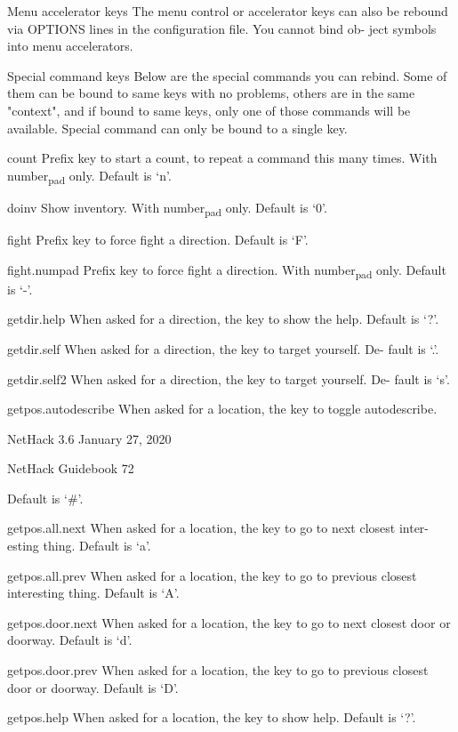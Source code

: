 \documentclass[11pt]{article}
\begin{document}
Menu accelerator keys
 The menu control or accelerator keys can also be rebound via
 OPTIONS lines in the configuration file. You cannot bind ob-
 ject symbols into menu accelerators.

Special command keys
 Below are the special commands you can rebind.  Some of them
 can be bound to same keys with no problems, others are in the
 same "context", and if bound to same keys, only one of those
 commands will be available. Special command can only be bound
 to a single key.

count
 Prefix key to start a count, to repeat a command this many
 times. With number\textsubscript{pad} only. Default is `n'.

doinv
 Show inventory. With number\textsubscript{pad} only. Default is `0'.

fight
 Prefix key to force fight a direction. Default is `F'.

fight.numpad
 Prefix key to force fight a direction. With number\textsubscript{pad} only.
 Default is `-'.

getdir.help
 When asked for a direction, the key to show the help.  Default
 is `?'.

getdir.self
 When asked for a direction, the key to target yourself. De-
 fault is `.'.

getdir.self2
 When asked for a direction, the key to target yourself.  De-
 fault is `s'.

getpos.autodescribe
 When asked for a location, the key to toggle autodescribe.


NetHack 3.6                   January 27, 2020




NetHack Guidebook                       72



Default is `\#'.

getpos.all.next
 When asked for a location, the key to go to next closest inter-
 esting thing. Default is `a'.

getpos.all.prev
 When asked for a location, the key to go to previous closest
 interesting thing. Default is `A'.

getpos.door.next
 When asked for a location, the key to go to next closest door
 or doorway. Default is `d'.

getpos.door.prev
 When asked for a location, the key to go to previous closest
 door or doorway. Default is `D'.

getpos.help
 When asked for a location, the key to show help.  Default is
 `?'.
\end{document}
